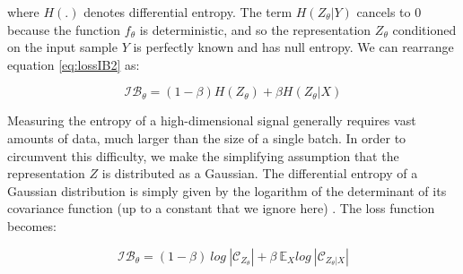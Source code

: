 where $H(.)$ denotes differential entropy. The term $H(Z_{\theta}|Y)$ cancels to 0 because the function $f_{\theta}$ is deterministic, and so the representation $Z_{\theta}$ conditioned on the input sample $Y$ is perfectly known and has null entropy. We can rearrange equation \ref{eq:lossIB2} as: 

\begin{equation}
   \mathcal{IB_{ \theta}} = (1-\beta) H(Z_{\theta})+ \beta H(Z_{\theta}|X) 
    \label{eq:lossIB3}
\end{equation}

Measuring the entropy of a high-dimensional signal generally requires vast amounts of data, much larger than the size of a single batch. In order to circumvent this difficulty, we make the simplifying assumption that the representation $Z$ is distributed as a Gaussian. The differential entropy of a Gaussian distribution is simply given by the logarithm of the determinant of its covariance function (up to a constant that we ignore here) \cite{cai_law_2015}. The loss function becomes:  

\begin{equation}
   \mathcal{IB_{ \theta}} = (1-\beta) ~log ~|\mathcal{C}_{Z_\theta}|+ \beta ~\mathbb{E}_{X} log ~|\mathcal{C}_{Z_\theta|X}|
    \label{eq:lossIB4}
\end{equation}

